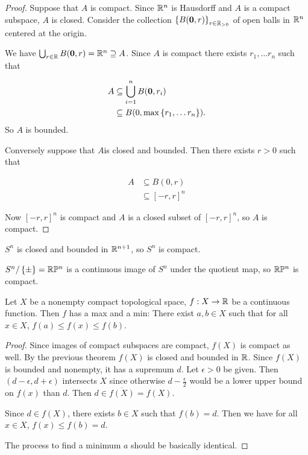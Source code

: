 \documentclass[12pt, twosided]{article}
\begin{document}
\begin{proof}
  Suppose that \(A\) is compact. Since \(\mathbb{R}^n\) is Hausdorff and \(A\) is a compact subspace, \(A\) is closed. Consider the collection \(\left\{ B(\mathbf{0}, r) \right\}_{r\in \mathbb{R}_{> 0}}\) of open balls in \(\mathbb{R}^n\) centered at the origin.

  We have \(\bigcup_{r \in \mathbb{R}} B(\mathbf{0}, r) = \mathbb{R}^n \supseteq A\). Since \(A\) is compact there exists \(r_1, \ldots r_n\) such that

  \begin{align*}
    A &\subseteq \bigcup_{i = 1}^n B(\mathbf{0}, r_i) \\
      &\subseteq B(0, \mathrm{max}\left\{ r_1, \ldots r_n\right\}).
  \end{align*}
  So \(A\) is bounded. \partdone


Conversely suppose that \(A\)is closed and bounded. Then there exists \(r > 0 \) such that

\begin{align*}
  A &\subseteq B(0, r) \\
    &\subseteq [-r, r]^n
\end{align*}

Now \([-r, r]^n\) is compact and \(A\) is a closed subset of \([-r, r]^n\), so \(A\) is compact.
\end{proof}
\begin{exa}
  \(S^n\) is closed and bounded in \(\mathbb{R}^{n + 1}\), so \(S^n\) is compact.

  \(S^n/\left\{ \pm \right\} = \mathbb{R}\mathbb{P}^n\) is a continuous image of \(S^n\) under the quotient map, so \(\mathbb{R}\mathbb{P}^n\) is compact.
\end{exa}

\begin{thm}
  Let \(X\) be a nonempty compact topological space, \(f: X \to \mathbb{R}\) be a continuous function. Then \(f\) has a max and a min: There exist \(a, b \in X\) such that for all \(x \in X\), \(f(a) \leq f(x) \leq f(b)\).
\end{thm}

\begin{proof}
  Since images of compact subspaces are compact, \(f(X)\) is compact as well. By the previous theorem \(f(X)\) is closed and bounded in \(\mathbb{R}\). Since \(f(X)\) is bounded and nonempty, it has a supremum \(d\). Let \(\epsilon >0\) be given. Then \((d - \epsilon, d + \epsilon)\) intersects \(X\) since otherwise \(d - \frac{\epsilon}{2}\) would be a lower upper bound on \(f(x)\) than \(d\). Then \(d \in \overline{f(X)} = f(X)\). 

  Since \(d \in f(X)\), there exists \(b \in X\) such that \(f(b) = d\). Then we have for all \(x \in X\), \(f(x) \leq f(b) = d\). \partdone

  The process to find a minimum \(a\) should be basically identical.
\end{proof}
\end{document}
